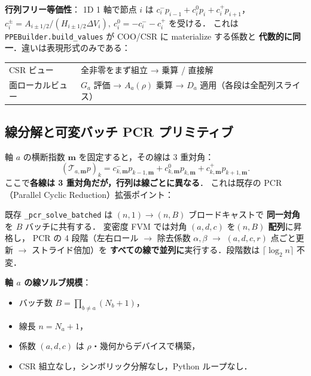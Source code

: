 \noindent\textbf{行列フリー等価性}：
1D 1 軸で節点 $i$ は
$c_i^- p_{i-1} + c_i^0 p_i + c_i^+ p_{i+1}$，
$c_i^\pm = A_{i\pm 1/2}/(H_{i\pm 1/2}\Delta V_i),\ c_i^0=-c_i^-\!-c_i^+$ を受ける．
これは \texttt{PPEBuilder.build\_values} が COO/CSR に materialize する係数と
\textbf{代数的に同一}．違いは表現形式のみである：
\begin{center}
\begin{tabular}{@{}ll@{}}
\hline
CSR ビュー & 全非零をまず組立 → 乗算 / 直接解 \\
面ローカルビュー & $G_a$ 評価 → $A_a(\rho)$ 乗算 → $D_a$ 適用（各段は全配列スライス）\\
\hline
\end{tabular}
\end{center}

\subsection{線分解と可変バッチ PCR プリミティブ}
\label{sec:gpu_fvm_variable_pcr}
\label{app:gpu_fvm_pcr}%

軸 $a$ の横断指数 $\mathbf{m}$ を固定すると，その線は 3 重対角：
\begin{equation}
  (\mathcal{T}_{a,\mathbf{m}} p)_k
    = c^-_{k,\mathbf{m}} p_{k-1,\mathbf{m}}
    + c^0_{k,\mathbf{m}} p_{k,\mathbf{m}}
    + c^+_{k,\mathbf{m}} p_{k+1,\mathbf{m}}.
  \label{eq:fvm_tridiag_line}
\end{equation}
ここで\textbf{各線は 3 重対角だが，行列は線ごとに異なる}．
これは既存の PCR（Parallel Cyclic Reduction）拡張ポイント：

\begin{tcolorbox}[resultbox,title={可変バッチ PCR：$\text{PCRVar}(a,d,c,r)$}]
既存 \texttt{\_pcr\_solve\_batched} は $(n,1) \to (n,B)$ ブロードキャストで
\textbf{同一対角}を $B$ バッチに共有する．
変密度 FVM では対角 $(a,d,c)$ を\textbf{$(n,B)$ 配列}に昇格し，
PCR の 4 段階（左右ロール $\to$ 除去係数 $\alpha,\beta$ $\to$
$(a,d,c,r)$ 点ごと更新 $\to$ ストライド倍加）を
\textbf{すべての線で並列に}実行する．段階数は $\lceil\log_2 n\rceil$ 不変．
\end{tcolorbox}

\noindent\textbf{軸 $a$ の線ソルブ規模}：
\begin{itemize}[noitemsep]
  \item バッチ数 $B = \prod_{b\neq a}(N_b+1)$，
  \item 線長 $n = N_a+1$，
  \item 係数 $(a,d,c)$ は $\rho$・幾何からデバイスで構築，
  \item CSR 組立なし，シンボリック分解なし，Python ループなし．
\end{itemize}

